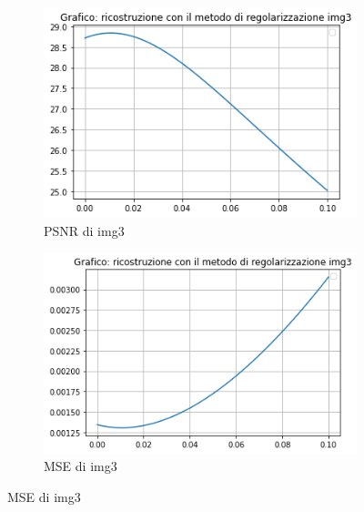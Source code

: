 \begin{figure}[H]\ContinuedFloat
    \centering
    \begin{subfigure}{0.5\textwidth}
        \centering
        \includegraphics[width=\textwidth]{output/PSNR/outputPSNR-img3.png}
        \caption{PSNR di img3}
        \label{fig:img3PSNR}
    \end{subfigure}\hfill
    \begin{subfigure}{0.5\textwidth}
        \centering
        \includegraphics[width=\textwidth]{output/MSE/outputMSE-img3.png}
        \caption{MSE di img3}
        \label{fig:img3MSE}
    \end{subfigure}


\end{figure}
